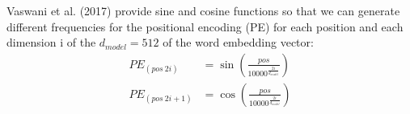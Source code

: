 \documentclass{article}
\begin{document}
Vaswani et al. (2017) provide sine and cosine functions so that we can generate different frequencies for the positional encoding (PE) for each position and each dimension i of the $d_{model} = 512$ of the word embedding vector:
\begin{equation}
    \begin{aligned}
        PE_{(pos~2i)}   & =\sin\left(\frac{pos}{10000^{\frac{2i}{d_{model}}}}\right) \\
        PE_{(pos~2i+1)} & =\cos\left(\frac{pos}{10000^{\frac{2i}{d_{model}}}}\right) \\
    \end{aligned}
\end{equation}
\end{document}
